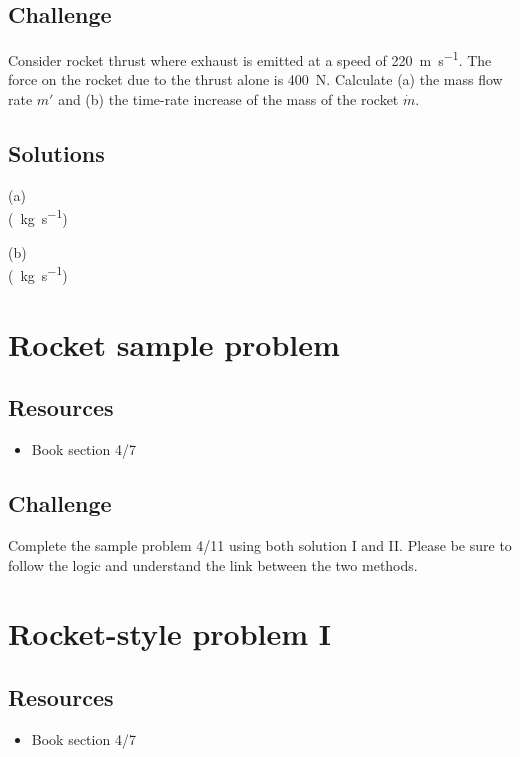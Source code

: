 \subsection*{Challenge}
Consider rocket thrust where exhaust is emitted at a speed of \SI{220}{\meter\per\second}. The force on the rocket due to the thrust alone is \SI{400}{\newton}. Calculate (a) the mass flow rate $m'$ and (b) the time-rate increase of the mass of the rocket $\dot{m}$.

\subsection*{Solutions}
(a)\\
 (\SI{}{\kg\per\second})

(b)\\
 (\SI{}{\kg\per\second})




\newpage
\section{Rocket sample problem}

\subsection*{Resources}
\begin{itemize}
    \item Book section 4/7
\end{itemize}

\subsection*{Challenge}
Complete the sample problem 4/11 using both solution I and II. Please be sure to follow the logic and understand the link between the two methods.




\newpage
\section{Rocket-style problem I}

\subsection*{Resources}
\begin{itemize}
    \item Book section 4/7
\end{itemize}

